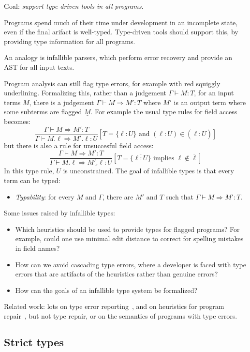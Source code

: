 \documentclass[acmsmall]{acmart}
\newcommand{\squnder}[1]{\underline{#1}}
\newcommand{\infer}[2]{\frac{\textstyle#1}{\textstyle#2}}
\begin{document}
Goal: \emph{support type-driven tools in all programs}.

Programs spend much of their time under development in an incomplete state, even if the final arifact
is well-typed. Type-driven tools should support this, by providing type information for all programs.

An analogy is infallible parsers, which perform error recovery and provide an AST for all input texts.

Program analysis can still flag type errors, for example with red
squiggly underlining. Formalizing this, rather than a judgement
$\Gamma\vdash M:T$, for an input terms $M$, there is a judgement
$\Gamma \vdash M \Rightarrow M' : T$ where $M'$ is an output term
where some subterms are flagged $\squnder{M}$. For example the usual
type rules for field access becomes:
\[
  \infer{
    \Gamma \vdash M \Rightarrow M' : T
  }{
    \Gamma \vdash M.\ell \Rightarrow M'.\ell : U
  }
  [
    T = \{ \overline{\ell:U} \} \mbox{ and } (\ell:U) \in (\overline{\ell:U})
  ]
\]
but there is also a rule for unsuccesful field access:  
\[
  \infer{
    \Gamma \vdash M \Rightarrow M' : T
  }{
    \Gamma \vdash M.\ell \Rightarrow \squnder{M'.\ell} : U
  }
  [
    T = \{ \overline{\ell:U} \} \mbox{ implies } \ell \not\in \overline{\ell}
  ]
\]
In this type rule, $U$ is unconstrained. The goal of infallible types is that every term can be typed:
\begin{itemize}
\item \emph{Typability}: for every $M$ and $\Gamma$,
  there are $M'$ and $T$ such that $\Gamma \vdash M \Rightarrow M' : T$.
\end{itemize}
Some issues raised by infallible types:
\begin{itemize}
\item Which heuristics should be used to provide types for flagged programs? For example, could one
  use minimal edit distance to correct for spelling mistakes in field names?
\item How can we avoid cascading type errors, where a developer is
  faced with type errors that are artifacts of the heuristics rather
  than genuine errors?
\item How can the goals of an infallible type system be formalized?
\end{itemize}
Related work: lots on type error reporting~\cite{???}, and on
heuristics for program repair~\cite{???}, but not type repair, or on
the semantics of programs with type errors.

\subsection{Strict types}
\end{document}
